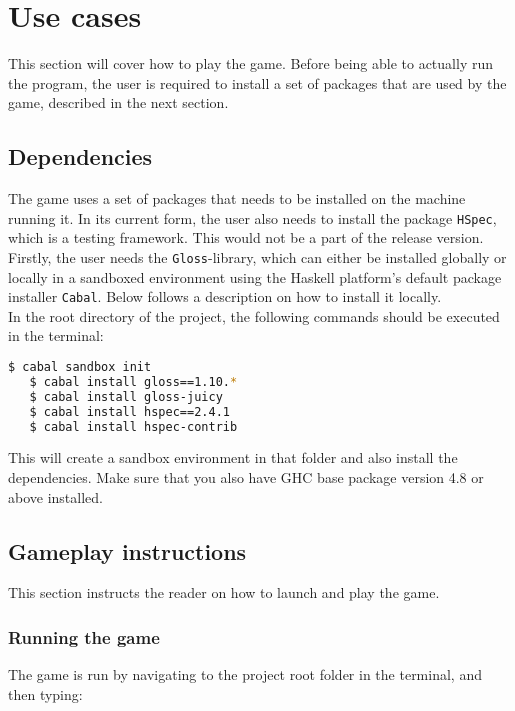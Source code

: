 \documentclass{article}
\begin{document}
\section{Use cases}
This section will cover how to play the game. Before being able to actually run the program, the user is required to install a set of packages that are used by the game, described in the next section.

	\subsection{Dependencies}
	The game uses a set of packages that needs to be 		installed on the machine running it.
	In its current form, the user also needs to install the package \texttt{HSpec}, which is a testing framework. This would not be a part of the release version.\\
		\newline
	Firstly, the user needs the \texttt{Gloss}-library, which can either be installed globally or locally in a sandboxed environment using the Haskell platform's default package installer \texttt{Cabal}. Below follows 	a description on how to install it locally.\\
		\newline
	In the root directory of the project, the following commands should be executed in the terminal:\\

    \begin{lstlisting}[language=Bash]
   $ cabal sandbox init
   $ cabal install gloss==1.10.*
   $ cabal install gloss-juicy
   $ cabal install hspec==2.4.1
   $ cabal install hspec-contrib
   \end{lstlisting}

   This will create a sandbox environment in that folder and also install the dependencies. Make sure that you also have GHC base package version 4.8 or above installed.

	\subsection{Gameplay instructions}
	This section instructs the reader on how to launch and play the game.

		\subsubsection{Running the game}
		The game is run by navigating to the project root folder in the terminal, and then typing:\\
\end{document}
